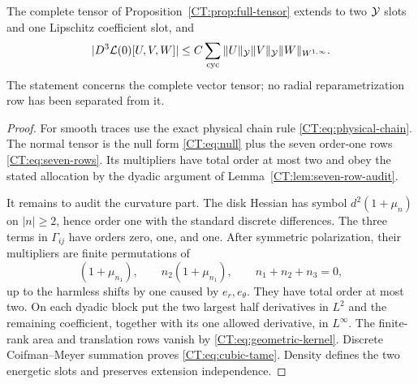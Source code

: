 \begin{proposition}
\label{CT:prop:cubic-tame}
The complete tensor of Proposition~\ref{CT:prop:full-tensor} extends to two
$\mathcal Y$ slots and one Lipschitz coefficient slot, and
\begin{equation}\label{CT:eq:cubic-tame}
 |D^3\mathcal L(0)[U,V,W]|
 \le C\sum_{\rm cyc}
 \|U\|_\mathcal Y\|V\|_\mathcal Y\|W\|_{W^{1,\infty}}.
\end{equation}
The statement concerns the complete vector tensor; no radial
reparametrization row has been separated from it.
\end{proposition}

\begin{proof}
For smooth traces use the exact physical chain rule
\eqref{CT:eq:physical-chain}.  The normal tensor is the null form
\eqref{CT:eq:null} plus the seven order-one rows
\eqref{CT:eq:seven-rows}.  Its multipliers have total order at most two and
obey the stated allocation by the dyadic argument of
Lemma~\ref{CT:lem:seven-row-audit}.

It remains to audit the curvature part.  The disk Hessian has symbol
$d^2(1+\mu_n)$ on $|n|\ge2$, hence order one with the standard discrete
differences.  The three terms in $\Gamma_{ij}$ have orders zero, one, and
one.  After symmetric polarization, their multipliers are finite
permutations of
\begin{equation*}
 (1+\mu_{n_1}),\qquad
 n_2(1+\mu_{n_1}),
 \qquad n_1+n_2+n_3=0,
\end{equation*}
up to the harmless shifts by one caused by $e_r,e_\theta$.  They have
total order at most two.  On each dyadic block put the two largest half
derivatives in $L^2$ and the remaining coefficient, together with its one
allowed derivative, in $L^\infty$.  The finite-rank area and translation
rows vanish by \eqref{CT:eq:geometric-kernel}.  Discrete Coifman--Meyer
summation proves \eqref{CT:eq:cubic-tame}.  Density defines the two energetic
slots and preserves extension independence.
\end{proof}

